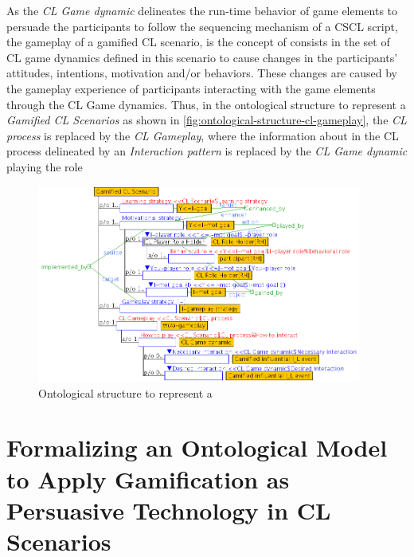 As the \emph{CL Game dynamic} delineates the run-time behavior of game elements to persuade the participants to follow the sequencing mechanism of a CSCL script, the gameplay of a gamified CL scenario, is the concept of  consists in the set of CL game dynamics defined in this scenario to cause changes in the participants' attitudes, intentions, motivation and/or behaviors.
These changes are caused by the gameplay experience of participants interacting with the game elements through the CL Game dynamics.
Thus, in the ontological structure to represent a \emph{Gamified CL Scenarios} as shown in \autoref{fig:ontological-structure-cl-gameplay}, the \emph{CL process} is replaced by the \emph{CL Gameplay}, where the information about  in the CL process delineated by an \emph{Interaction pattern} is replaced by the \emph{CL Game dynamic} playing the role  

\begin{figure}[!htbp]
 \caption[Ontological structure to represent a \emph{Gamified CL Scenario}]{Ontological structure to represent a }
 \label{fig:ontological-structure-cl-gameplay}
 \centering
 \includegraphics[width=0.95\textwidth]{images/chap-ontogacles2/ontological-structure-gamified-cl-scenario.png}
 \fautor
\end{figure}

\section[Formalizing an Ontological Model to Apply Gamification as Persuasive Technology]{Formalizing an Ontological Model to Apply Gamification as Persuasive Technology in CL Scenarios}
\label{sec:formalizing-ontological-model-apply-gamification-persuasive-technology}

